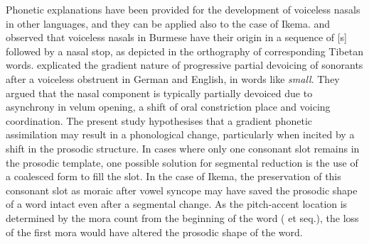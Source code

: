 \documentclass[output=paper]{langscibook}
\begin{document}
Phonetic explanations have been provided for the development of voiceless nasals in other languages, and they can be applied also to the case of Ikema. \citet{Ohala1975} and \citet{OhalaOhala1993} observed that voiceless nasals in Burmese have their origin in a sequence of [s] followed by a nasal stop, as depicted in the orthography of corresponding Tibetan words. \citet{BarryKunzel1978} explicated the gradient nature of progressive partial devoicing of sonorants after a voiceless obstruent in German and English, in words like \textit{small}. They argued that the nasal component is typically partially devoiced due to asynchrony in velum opening, a shift of oral constriction place and voicing coordination. The present study hypothesises that a gradient phonetic assimilation may result in a phonological change, particularly when incited by a shift in the prosodic structure. In cases where only one consonant slot remains in the prosodic template, one possible solution for segmental reduction is the use of a coalesced form to fill the slot. In the case of Ikema, the preservation of this consonant slot as moraic after vowel syncope may have saved the prosodic shape of a word intact even after a segmental change. As the pitch-accent location is determined by the mora count from the beginning of the word (\citealt{IgarashiEtAl2011} et seq.), the loss of the first mora would have altered the prosodic shape of the word.
\end{document}
